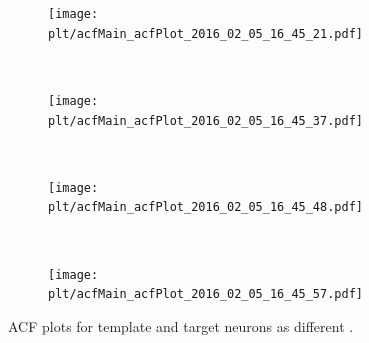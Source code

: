 \documentclass[11pt]{article}
\newcommand{\plt}{../../plots}
\begin{document}
\begin{figure}
    \centering
    \begin{subfigure}[b]{.48\textwidth}
        \centering
        \texttt{[image: \\plt/acfMain\_acfPlot\_2016\_02\_05\_16\_45\_21.pdf]}
    \end{subfigure}
    ~
    \begin{subfigure}[b]{.48\textwidth}
        \centering
        \texttt{[image: \\plt/acfMain\_acfPlot\_2016\_02\_05\_16\_45\_37.pdf]}
    \end{subfigure}
    \\
    \begin{subfigure}[b]{.48\textwidth}
        \centering
        \texttt{[image: \\plt/acfMain\_acfPlot\_2016\_02\_05\_16\_45\_48.pdf]}
    \end{subfigure}
    ~
    \begin{subfigure}[b]{.48\textwidth}
        \centering
        \texttt{[image: \\plt/acfMain\_acfPlot\_2016\_02\_05\_16\_45\_57.pdf]}
    \end{subfigure}
    \caption{ACF plots for template and target neurons as different .}
    \label{img:acf2}
\end{figure}

\FloatBarrier
\end{document}

